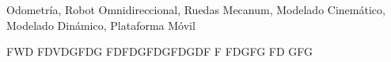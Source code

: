 
\begin{resumen}{Odometría, Robot Omnidireccional, Ruedas Mecanum, Modelado Cinemático, Modelado Dinámico, Plataforma Móvil}


FWD FDVDGFDG FDFDGFDGFDGDF F FDGFG FD GFG


\end{resumen}